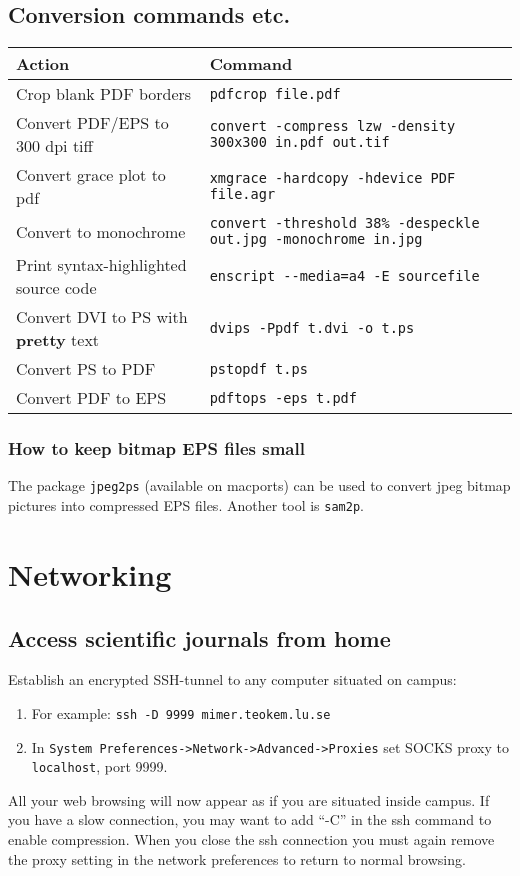 \documentclass[a4paper,10pt]{article}
\begin{document}
\subsection{Conversion commands etc.}
\begin{table}[h!]
\center
\begin{small}
\begin{tabular}{ll}\hline\hline
Action              & Command \\\hline
Crop blank PDF borders & \verb"pdfcrop file.pdf" \\
Convert PDF/EPS to 300 dpi tiff & \verb"convert -compress lzw -density 300x300 in.pdf out.tif" \\
Convert grace plot to pdf       & \verb"xmgrace -hardcopy -hdevice PDF file.agr"\\
Convert to monochrome           & \verb"convert -threshold 38% -despeckle out.jpg -monochrome in.jpg"\\
Print syntax-highlighted source code & \verb"enscript --media=a4 -E sourcefile"\\
Convert DVI to PS with \textbf{pretty} text & \verb"dvips -Ppdf t.dvi -o t.ps"\\
Convert PS to PDF                           & \verb"pstopdf t.ps"\\
Convert PDF to EPS                          & \verb"pdftops -eps t.pdf"\\
\hline
\end{tabular}\end{small}\end{table}

\subsubsection{How to keep bitmap EPS files small}
The package \verb"jpeg2ps" (available on macports) can be used to convert jpeg bitmap pictures into compressed EPS files. Another tool is \verb"sam2p".



\section{Networking}
\subsection{\label{sec:proxy}Access scientific journals from home}
Establish an encrypted SSH-tunnel to any computer situated on campus:
\begin{enumerate}
\item For example: \verb+ssh -D 9999 mimer.teokem.lu.se+
\item In \verb+System Preferences->Network->Advanced->Proxies+ set SOCKS proxy to \verb+localhost+, port 9999.
\end{enumerate}
All your web browsing will now appear as if you are situated inside campus. If you have a slow connection, you may want to add ``-C'' in the ssh command to enable compression.  When you close the ssh connection you must again remove the proxy setting in the network preferences to return to normal browsing.
\end{document}
